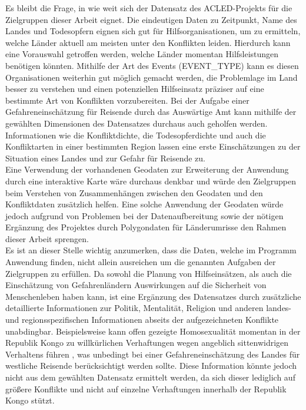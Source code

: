 \documentclass[usegeometry=true]{scrartcl}
\begin{document}
Es bleibt die Frage, in wie weit sich der Datensatz des ACLED-Projekts für die Zielgruppen dieser Arbeit eignet. Die eindeutigen Daten zu Zeitpunkt, Name des Landes und Todesopfern eignen sich gut für Hilfsorganisationen, um zu ermitteln, welche Länder aktuell am meisten unter den Konflikten leiden. Hierdurch kann eine Vorauswahl getroffen werden, welche Länder momentan Hilfsleistungen benötigen könnten. Mithilfe der Art des Events (EVENT\_TYPE) kann es diesen Organisationen weiterhin gut möglich gemacht werden, die Problemlage im Land besser zu verstehen und einen potenziellen Hilfseinsatz präziser auf eine bestimmte Art von Konflikten vorzubereiten. Bei der Aufgabe einer Gefahreneinschätzung für Reisende durch das Auswärtige Amt kann mithilfe der gewählten Dimensionen des Datensatzes durchaus auch geholfen werden. Informationen wie die Konfliktdichte, die Todesopferdichte und auch die Konfliktarten in einer bestimmten Region lassen eine erste Einschätzungen zu der Situation eines Landes und zur Gefahr für Reisende zu.\\ Eine Verwendung der vorhandenen Geodaten zur Erweiterung der Anwendung durch eine interaktive Karte wäre durchaus denkbar und würde den Zielgruppen beim Verstehen von Zusammenhängen zwischen den Geodaten und den Konfliktdaten zusätzlich helfen. Eine solche Anwendung der Geodaten würde jedoch aufgrund von Problemen bei der Datenaufbereitung sowie der nötigen Ergänzung des Projektes durch Polygondaten für Länderumrisse den Rahmen dieser Arbeit sprengen.\\ Es ist an dieser Stelle wichtig anzumerken, dass die Daten, welche im Programm Anwendung finden, nicht allein ausreichen um die genannten Aufgaben der Zielgruppen zu erfüllen. Da sowohl die Planung von Hilfseinsätzen, als auch die Einschätzung von Gefahrenländern Auswirkungen auf die Sicherheit von Menschenleben haben kann, ist eine Ergänzung des Datensatzes durch zusätzliche detaillierte Informationen zur Politik, Mentalität, Religion und anderen landes- und regionsspezifischen Informationen abseits der aufgezeichneten Konflikte unabdingbar. Beispielsweise kann offen gezeigte Homosexualität momentan in der Republik Kongo zu willkürlichen Verhaftungen wegen angeblich sittenwidrigen Verhaltens führen \cite{aa-kongo}, was unbedingt bei einer Gefahreneinschätzung des Landes für westliche Reisende berücksichtigt werden sollte. Diese Information könnte jedoch nicht aus dem gewählten Datensatz ermittelt werden, da sich dieser lediglich auf größere Konflikte und nicht auf einzelne Verhaftungen innerhalb der Republik Kongo stützt.
\end{document}
